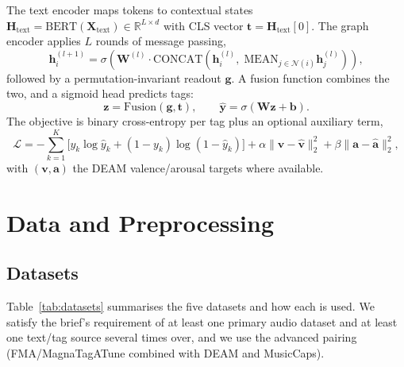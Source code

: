 \documentclass{article}
\begin{document}
The text encoder maps tokens to contextual states
$\mathbf{H}_{\text{text}} = \mathrm{BERT}(\mathbf{X}_{\text{text}}) \in
\mathbb{R}^{L \times d}$ with CLS vector $\mathbf{t} = \mathbf{H}_{\text{text}}[0]$.
The graph encoder applies $L$ rounds of message passing,
\begin{equation}
\mathbf{h}_i^{(l+1)} = \sigma\!\left(\mathbf{W}^{(l)} \cdot
\mathrm{CONCAT}\!\left(\mathbf{h}_i^{(l)},\;
\mathrm{MEAN}_{j \in \mathcal{N}(i)} \mathbf{h}_j^{(l)}\right)\right),
\end{equation}
followed by a permutation-invariant readout $\mathbf{g}$. A fusion function
combines the two, and a sigmoid head predicts tags:
\begin{equation}
\mathbf{z} = \mathrm{Fusion}(\mathbf{g}, \mathbf{t}), \qquad
\hat{\mathbf{y}} = \sigma(\mathbf{W}\mathbf{z} + \mathbf{b}).
\end{equation}
The objective is binary cross-entropy per tag plus an optional auxiliary term,
\begin{equation}
\mathcal{L} = -\sum_{k=1}^{K}\Big[y_k \log \hat{y}_k + (1-y_k)\log(1-\hat{y}_k)\Big]
 + \alpha \lVert \mathbf{v} - \hat{\mathbf{v}} \rVert_2^2
 + \beta  \lVert \mathbf{a} - \hat{\mathbf{a}} \rVert_2^2 ,
\end{equation}
with $(\mathbf{v}, \mathbf{a})$ the DEAM valence/arousal targets where available.

\section{Data and Preprocessing}

\subsection{Datasets}

Table~\ref{tab:datasets} summarises the five datasets and how each is used. We
satisfy the brief's requirement of at least one primary audio dataset and at least
one text/tag source several times over, and we use the advanced pairing
(FMA/MagnaTagATune combined with DEAM and MusicCaps).
\end{document}
